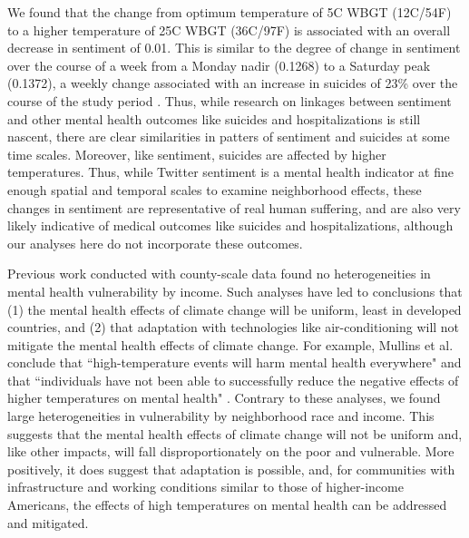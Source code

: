 \documentclass[fleqn,10pt]{wlscirep}
\begin{document}
We found that the change from optimum temperature of 5\textdegree C WBGT (12\textdegree C/54\textdegree F) to a higher temperature of 25\textdegree C WBGT (36\textdegree C/97\textdegree F) is associated with an overall decrease in sentiment of 0.01.  This is similar to the degree of change in sentiment over the course of a week from a Monday nadir (0.1268) to a Saturday peak (0.1372), a weekly change associated with an increase in suicides of 23\% over the course of the study period \cite{CDC2021}. Thus, while research on linkages between sentiment and other mental health outcomes like suicides and hospitalizations is still nascent, there are clear similarities in patters of sentiment and suicides at some time scales. Moreover, like sentiment, suicides are affected by higher temperatures. Thus, while Twitter sentiment is a mental health indicator at fine enough spatial and temporal scales to examine neighborhood effects, these changes in sentiment are representative of real human suffering, and are also very likely indicative of medical outcomes like suicides and hospitalizations, although our analyses here do not incorporate these outcomes.

Previous work conducted with county-scale data found no heterogeneities in mental health vulnerability by income.  Such analyses have led to conclusions that (1) the mental health effects of climate change will be uniform, least in developed countries, and (2) that adaptation with technologies like air-conditioning will not mitigate the mental health effects of climate change.  For example, Mullins et al. conclude that ``high-temperature events will harm mental health everywhere" and that ``individuals have not been able to successfully reduce the negative effects of higher temperatures on mental health" \cite{Mullins2019Dec}. Contrary to these analyses, we found large heterogeneities in vulnerability by neighborhood race and income.  This suggests that the mental health effects of climate change will not be uniform and, like other impacts, will fall disproportionately on the poor and vulnerable.  More positively, it does suggest that adaptation is possible, and, for communities with infrastructure and working conditions similar to those of higher-income Americans, the effects of high temperatures on mental health can be addressed and mitigated.
\end{document}
